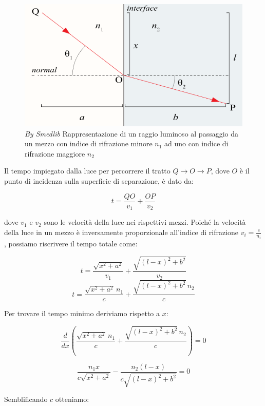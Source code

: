 \documentclass[12pt,a4paper]{report}
\begin{document}
\begin{figure}[!ht]
    \centering
    \includegraphics[width=\linewidth]{Immagini/Snells_law_Diagram_B_vector.png}
    \captionsetup{width=.8\linewidth}
    \caption[\textit{By Oleg Alexandrov}]{\textit{By Smedlib\footnotemark} Rappresentazione di un raggio luminoso al passaggio da un mezzo con indice di rifrazione minore \( n_1 \) ad uno con indice di rifrazione maggiore \( n_2 \)}
    \label{fig:snellsLaw}
\end{figure}


Il tempo impiegato dalla luce per percorrere il tratto \( Q \to O \to P \), dove \( O \) è il punto di incidenza sulla superficie di separazione, è dato da:

\[ t = \frac{QO}{v_1} + \frac{OP}{v_2} \]

dove \( v_1 \) e \( v_2 \) sono le velocità della luce nei rispettivi mezzi. Poiché la velocità della luce in un mezzo è inversamente proporzionale all'indice di rifrazione \( v_i = \frac{c}{n_i} \), possiamo riscrivere il tempo totale come:

\[ t = \frac{\sqrt{x^2 + a^2}}{v_1} + \frac{\sqrt{(l - x)^2 + b^2}}{v_2} \]
\[ t = \frac{\sqrt{x^2 + a^2} \, n_1}{c} + \frac{\sqrt{(l - x)^2 + b^2} \, n_2}{c} \]

Per trovare il tempo minimo deriviamo rispetto a \( x \):

\[ \frac{d}{dx} \left( \frac{\sqrt{x^2 + a^2} \, n_1}{c} + \frac{\sqrt{(l - x)^2 + b^2} \, n_2}{c} \right) = 0 \]

\[ \frac{n_1 x}{c \sqrt{x^2 + a^2}} - \frac{n_2 (l - x)}{c \sqrt{(l - x)^2 + b^2}} = 0 \]

Semblificando  \( c \) otteniamo:
\end{document}
